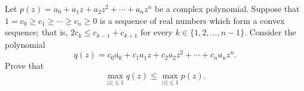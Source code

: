 Let \(p(z)=a_0+a_1z+a_2z^2+\cdots+a_nz^n\) be a complex polynomial.
Suppose that \(1=c_0\ge c_1\ge \cdots \ge c_n\ge 0\) is a sequence of real numbers which form a convex sequence;
that is, \(2c_k\le c_{k-1}+c_{k+1}\) for every \(k\in \{1,2,\dots,n-1\}\).
Consider the polynomial
\[ q(z)=c_0a_0+c_1a_1z+c_2a_2z^2+\cdots +c_na_nz^n. \]
Prove that
\[ \max_{|z|\le 1}q(z)\le \max_{|z|\le 1}p(z). \]